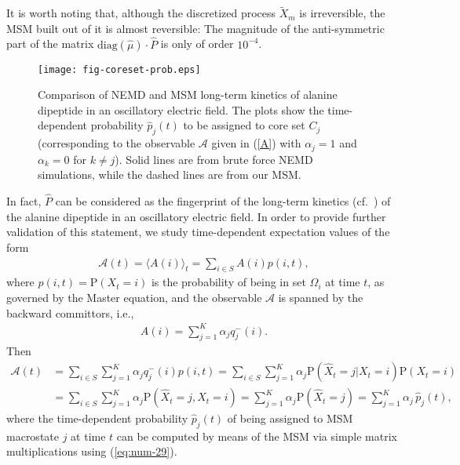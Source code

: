 \documentclass[journal=jctcce,manuscript=article]{achemso}
\newcommand{\bwd}[0]{-}
\newcommand{\prob}{\textrm{P}}
\begin{document}
It is worth noting that, although the discretized process $\tilde X_m$ is irreversible,
the MSM built out of it is almost reversible:
The magnitude of the anti-symmetric part of the
matrix $\textrm{diag}(\hat \mu)\cdot \hat P$ is only of order $10^{-4}$.



\begin{figure}
  \centering
  \texttt{[image: fig-coreset-prob.eps]}
  \caption{Comparison of NEMD and MSM long-term kinetics of alanine
    dipeptide in an oscillatory electric field. The plots show the
    time-dependent probability $\hat p_j(t)$ to be assigned to
    core set $C_j$ (corresponding to the observable $\mathcal A$ given
    in (\ref{A}) with $\alpha_j=1$ and $\alpha_k=0$ for $k\not=
    j$). Solid lines are from brute force NEMD simulations, while the
    dashed lines are from our MSM.}
  \label{fig:num-7}
\end{figure}

In fact, $\hat{P}$ can be considered as the fingerprint of the long-term kinetics (cf.~\cite{A19-39,PrinzKellerNoe_PCCP11_Perspective}) of the alanine dipeptide in an oscillatory electric field.
In order to provide further validation of this statement, we study  time-dependent expectation values of
the form
\begin{align}
  \mathcal A(t) = \langle A(i)\rangle_t = \sum_{i\in S} A(i) p(i,t),
\end{align}
where $p(i,t)=\prob(X_t=i)$ is the probability of being in set $\Omega_i$ at time $t$, as governed by the Master equation, and the observable $\mathcal A$ is  spanned by the backward
committors, i.e.,
\begin{align}\label{A}
  A(i) = \sum_{j=1}^K \alpha_j q^\bwd_j(i).
\end{align}
Then
\begin{align}\nonumber
  \mathcal A(t) &=
  \sum_{i\in S} \sum_{j=1}^K \alpha_j q^\bwd_j(i)  p(i,t)=\sum_{i\in S} \sum_{j=1}^K \alpha_j \prob (\hat X_t = j \vert X_t = i) \prob (X_t = i) \\
  & =
  \sum_{i\in S} \sum_{j=1}^K \alpha_j \prob (\hat X_t = j ,X_t = i)  =
  \sum_{j=1}^K \alpha_j \prob (\hat X_t = j) 
 =
   \sum_{j=1}^K \alpha_j \,\hat p_j (t), \label{eq:num-28}
\end{align}
where the time-dependent probability $\hat{p}_j(t)$ of being assigned to MSM macrostate $j$ at time $t$ can be computed  by means of the MSM via simple matrix multiplications using (\ref{eq:num-29}).
\end{document}
